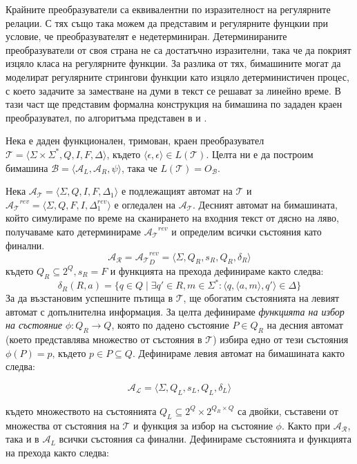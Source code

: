 \documentclass[12pt, oneside]{article}
\theoremstyle{definition}
\begin{document}
Крайните преобразуватели са еквивалентни по изразителност на регулярните релации. С тях също така можем да представим и регулярните фунцкии при условие, че преобразувателят е недетерминиран. Детерминираните преобразуватели от своя страна не са достатъчно изразителни, така че да покрият изцяло класа на регулярните функции. За разлика от тях, бимашините могат да моделират регулярните стрингови функции \cite{Schutzenberger:61} като изцяло детерминистичен процес, с което задачите за заместване на думи в текст се решават за линейно време. В тази част ще представим формална конструкция на бимашина по зададен краен преобразувател, по алгоритъма представен в \cite{GerdjikovEtAl:2017} и \cite{Mihov:2018-2}.

Нека е даден функционален, тримован, краен преобразувател \( \mathcal{T} = \langle \Sigma \times \Sigma^*, Q, I, F, \Delta \rangle \), където \( \langle \epsilon, \epsilon \rangle \in L(\mathcal{T}) \). Целта ни е да построим бимашина \( \mathcal{B} = \langle \mathcal{A}_L, \mathcal{A}_R, \psi \rangle \), така че \( L(\mathcal{T}) = O_\mathcal{B} \).

Нека \( \mathcal{A_T} = \langle \Sigma, Q, I, F, \Delta_1 \rangle \) е подлежащият автомат на \( \mathcal{T} \) и \( \mathcal{A_T}^{rev} = \langle \Sigma, Q, F, I, \Delta_1^{rev} \rangle \) е огледален на \( \mathcal{A_T} \). Десният автомат на бимашината, който симулираме по време на сканирането на входния текст от дясно на ляво, получаваме като детерминираме \( \mathcal{A_T}^{rev} \) и определим всички състояния като финални.
\[ \mathcal{A_R} = \mathcal{A_T}^{rev}_D = \langle \Sigma, Q_R, s_R, Q_R, \delta_R \rangle \]
където \( Q_R \subseteq 2^Q, s_R = F \) и функцията на прехода дефинираме както следва:
\[ \delta_R(R,a) = \{ q \in Q \mid \exists q' \in R, m \in \Sigma^* : \langle q, \langle a, m \rangle, q' \rangle \in \Delta \} \]
За да възстановим успешните пътища в \(\mathcal{T}\), ще обогатим състоянията на левият автомат с допълнителна информация. За целта дефинираме \emph{функцията на избор на състояние} \( \phi: Q_R \to Q \), която по дадено състояние \(P \in Q_R \) на десния автомат (което представлява множество от състояния в \(\mathcal{T}\)) избира едно от тези състояния \( \phi(P) = p \text{, където } p \in P \subseteq Q \). Дефинираме левия автомат на бимашината както следва:

\[ \mathcal{A_L} = \langle \Sigma, Q_L, s_L, Q_L, \delta_L \rangle \]

където множеството на състоянията \( Q_L \subseteq 2^Q \times 2^{Q_R \times Q} \) са двойки, съставени от множества от състояния на \(\mathcal{T}\) и функция за избор на състояние \(\phi\). Както при \(\mathcal{A_R}\), така и в \(\mathcal{A}_L\) всички състояния са финални. Дефинираме състоянията и функцията на прехода както следва:
\end{document}
